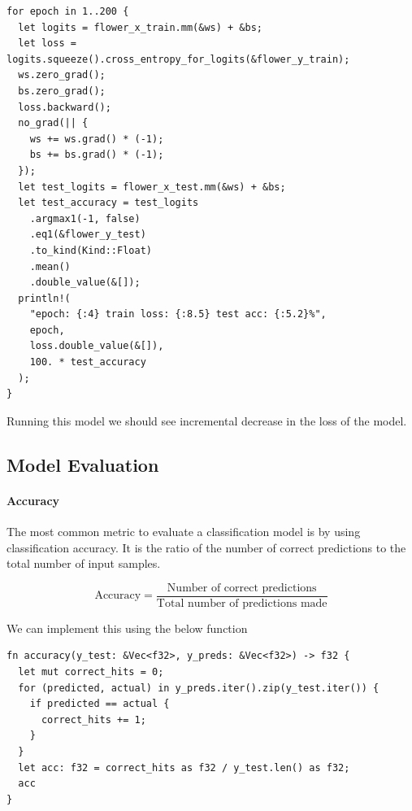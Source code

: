 \documentclass{book}
\begin{document}
\begin{lstlisting}[caption={chapter3\\/iris\_classification\_tchrs\\/src\\/main\\.rs}]
for epoch in 1..200 {
  let logits = flower_x_train.mm(&ws) + &bs;
  let loss = logits.squeeze().cross_entropy_for_logits(&flower_y_train);
  ws.zero_grad();
  bs.zero_grad();
  loss.backward();
  no_grad(|| {
    ws += ws.grad() * (-1);
    bs += bs.grad() * (-1);
  });
  let test_logits = flower_x_test.mm(&ws) + &bs;
  let test_accuracy = test_logits
    .argmax1(-1, false)
    .eq1(&flower_y_test)
    .to_kind(Kind::Float)
    .mean()
    .double_value(&[]);
  println!(
    "epoch: {:4} train loss: {:8.5} test acc: {:5.2}%",
    epoch,
    loss.double_value(&[]),
    100. * test_accuracy
  );
}
\end{lstlisting}
 
Running this model we should see incremental decrease in the loss of the model.

\label{par:}

\label{sub:neural_networks}

\subsection{Model Evaluation}%

\paragraph{Accuracy}%
The most common metric to evaluate a classification model is by using classification accuracy. It is the ratio of the number of correct predictions to the total number of input samples.

\begin{equation}
	\text{Accuracy} = \frac{\text{Number of correct predictions}}{\text{Total number of predictions made}} 
\end{equation}

We can implement this using the below function

\begin{lstlisting}[caption={ml\\-utils\\/src\\/sup\_metrics\\.rs}]
fn accuracy(y_test: &Vec<f32>, y_preds: &Vec<f32>) -> f32 {
  let mut correct_hits = 0;
  for (predicted, actual) in y_preds.iter().zip(y_test.iter()) {
    if predicted == actual {
      correct_hits += 1;
    }
  }
  let acc: f32 = correct_hits as f32 / y_test.len() as f32;
  acc
}
\end{lstlisting}
\end{document}
